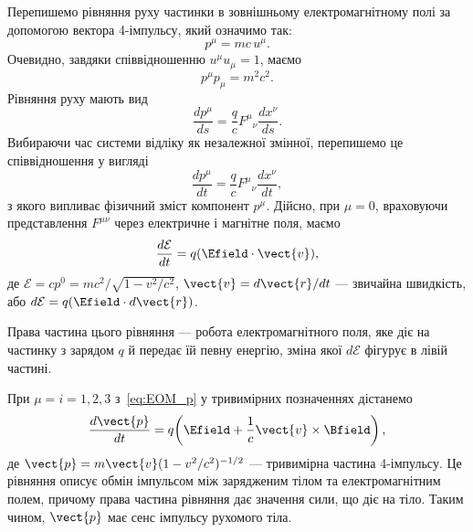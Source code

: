 Перепишемо рівняння руху частинки в зовнішньому електромагнітному полі за допомогою вектора
4-імпульсу, який означимо так:
\begin{equation*}
    p^{\mu} = mc\,u^{\mu}.
\end{equation*}
Очевидно, завдяки співвідношенню $u^{\mu}u_{\mu}=1$, маємо
\begin{equation}\label{eq:p_invariant}
    p^{\mu}p_{\mu} = m^2c^2.
\end{equation}
Рівняння руху мають вид
\begin{equation*}
    \frac{dp^{\mu}}{ds} = \frac{q}{c}F^{\mu}{}_{\nu}\frac{dx^{\nu}}{ds}.
\end{equation*}
Вибираючи час системи відліку як незалежної змінної, перепишемо це співвідношення у вигляді
\begin{equation}\label{eq:EOM_p}
    \frac{dp^{\mu}}{dt} = \frac{q}{c}F^{\mu}{}_{\nu}\frac{dx^{\nu}}{dt},
\end{equation}
з якого випливає фізичний зміст компонент $p^{\mu}$. Дійсно, при $\mu=0$, враховуючи представлення $F^{\mu\nu}$ через
електричне і магнітне поля, маємо
\begin{equation*}
    \frac{d\mathcal{E}}{dt} = q(\Efield\cdot\vect{v}),
\end{equation*}
де $\mathcal{E}=cp^0=mc^2/\sqrt{1-v^2/c^2}$, $\vect{v}=d\vect{r}/dt$ --- звичайна швидкість, або
$d\mathcal{E}=q(\Efield\cdot d\vect{r})$.

Права частина цього рівняння --- робота електромагнітного поля, яке діє на частинку з зарядом $q$ й передає їй певну
енергію, зміна якої $d\mathcal{E}$ фігурує в лівій частині.

При $\mu=i=1,2,3$ з~\eqref{eq:EOM_p} у тривимірних позначеннях дістанемо
\begin{equation*}
    \frac{d\vect{p}}{dt} = q\!\left(\Efield
    + \frac{1}{c}\vect{v}\times\Bfield\right),
\end{equation*}
де $\vect{p}=m\vect{v}(1-v^2/c^2)^{-1/2}$ --- тривимірна частина 4-імпульсу. Це рівняння описує обмін імпульсом між
зарядженим тілом та електромагнітним полем, причому права частина рівняння дає значення сили, що діє
на тіло. Таким чином, $\vect{p}$ має сенс імпульсу рухомого тіла.

